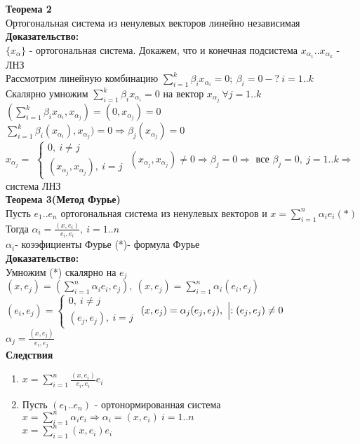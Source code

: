 \textbf{Теорема 2} \\
Ортогональная система из ненулевых векторов линейно независимая \\
\textbf{Доказательство: } \\
$\{ x_{\alpha} \}$ - ортогональная система. Докажем, что и конечная подсистема $x_{\alpha_1}..x_{\alpha_k}$ - ЛНЗ \\
Рассмотрим линейную комбинацию $\sum \limits_{i=1}^k {\beta_i x_{\alpha_i}}=0; \ \beta_i=0-? \ i=1..k$ \\
Скалярно умножим $\sum \limits_{i=1}^k {\beta_i x_{\alpha_i}}=0$ на вектор $x_{\alpha_j} \ \forall j=1..k$ \\
$\left( \sum \limits_{i=1}^k {\beta_i x_{\alpha_i}},x_{\alpha_j} \right)  =(0,x_{\alpha_j}) = 0$ \\
$\sum \limits_{i=1}^k {\beta_i (x_{\alpha_i}),x_{\alpha_j})} = 0 \Rightarrow \beta_j (x_{\alpha_j}) = 0 $ \\ 
$x_{\alpha_j} = $
$\left\{ \begin{matrix}
\mbox{$0, \ i \ne j $} \\
\mbox{$(x_{\alpha_j},x_{\alpha_j}), \ i=j$}
\end{matrix}\right.$
$(x_{\alpha_j},x_{\alpha_j}) \ne 0 \Rightarrow \beta_j = 0 \Rightarrow$ все $\beta_j=0, \ j=1..k \Rightarrow$ система ЛНЗ \\
\textbf{Теорема 3(Метод Фурье)} \\
Пусть $e_1..e_n$ ортогональная система из ненулевых векторов и $x=\sum \limits_{i=1}^n {\alpha_i e_i} (*) $ \\
Тогда $\alpha_i= \frac{(x,e_i)}{e_i,e_i}, \ i=1..n$\\
$\alpha_i$- коээфициенты Фурье (*)- формула Фурье \\
\textbf{Доказательство: } \\
Умножим (*) скалярно на $e_j$ \\
$(x,e_j)=\left( \sum \limits_{i=1}^{n} {\alpha_i e_i},e_j \right), \ (x,e_j) = \sum \limits_{i=1}^n {\alpha_i (e_i,e_j)} $ \\
$(e_i,e_j)=\left\{ \begin{matrix}
\mbox{$0, \ i \ne j $} \\
\mbox{$(e_j,e_j), \ i=j$}
\end{matrix}\right.$
$(x,e_j)=\alpha_j(e_j,e_j), \ \Bigl| :(e_j,e_j) \ne 0 $ \\
$\alpha_j= \frac{(x,e_j)}{e_i,e_j}$ \\
\textbf{Следствия} \\
\begin{enumerate}
 \item $x=\sum \limits_{i=1}^n {\frac{(x,e_i)}{e_i,e_i} e_i}$
 \item Пусть $(e_1..e_n)$ - ортонормированная система $ x = \sum \limits_{i=1}^n {\alpha_i e_i} \Rightarrow \alpha_i = (x,e_i) \ i=1..n $ \\
       $x=\sum \limits_{i=1}^n {(x,e_i)e_i} $
\end{enumerate}
